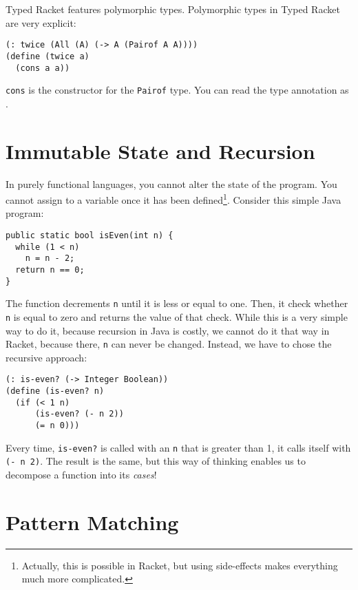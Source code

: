 \documentclass{article}
\begin{document}
Typed Racket features polymorphic types. Polymorphic types in Typed Racket are very explicit:

\begin{lstlisting}
(: twice (All (A) (-> A (Pairof A A))))
(define (twice a)
  (cons a a))
\end{lstlisting}

\lstinline{cons} is the constructor for the \lstinline{Pairof} type. You can read the type annotation as .

\section{Immutable State and Recursion}

In purely functional languages, you cannot alter the state of the program. You cannot assign to a variable once it has been defined\footnote{Actually, this is possible in Racket, but using side-effects makes everything much more complicated.}. Consider this simple Java program:

\begin{lstlisting}[style=Java]
public static bool isEven(int n) {
  while (1 < n)
    n = n - 2;
  return n == 0;
}
\end{lstlisting}

The function decrements \lstinline[style=Java]{n} until it is less or equal to one. Then, it check whether \lstinline[style=Java]{n} is equal to zero and returns the value of that check. While this is a very simple way to do it, because recursion in Java is costly, we cannot do it that way in Racket, because there, \lstinline{n} can never be changed. Instead, we have to chose the recursive approach:

\begin{lstlisting}
(: is-even? (-> Integer Boolean))
(define (is-even? n)
  (if (< 1 n)
      (is-even? (- n 2))
      (= n 0)))
\end{lstlisting}

Every time, \lstinline{is-even?} is called with an \lstinline{n} that is greater than 1, it calls itself with \lstinline{(- n 2)}. The result is the same, but this way of thinking enables us to decompose a function into its \emph{cases}!

\section{Pattern Matching}
\end{document}
